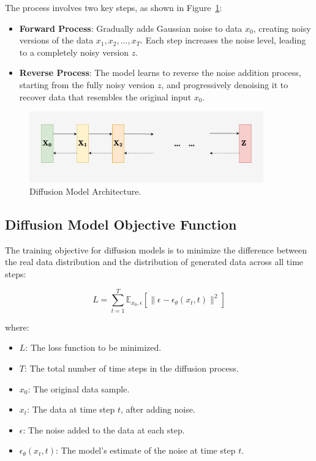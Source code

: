 The process involves two key steps, as shown in Figure~\ref{fig:Diffusion_structure}:
\begin{itemize}
  \item \textbf{Forward Process}: Gradually adds Gaussian noise to data \(x_0\), creating noisy versions of the data \(x_1, x_2, \dots, x_T\). Each step increases the noise level, leading to a completely noisy version \(z\).
  \item \textbf{Reverse Process}: The model learns to reverse the noise addition process, starting from the fully noisy version \(z\), and progressively denoising it to recover data that resembles the original input \(x_0\).
\end{itemize}

\begin{figure}[H]
    \centering
    \includegraphics[width=0.9\textwidth]{./Images/Diffusion_structure.jpg}
    \caption{Diffusion Model Architecture.}
    \label{fig:Diffusion_structure}
\end{figure}

\subsection{Diffusion Model Objective Function}

The training objective for diffusion models is to minimize the difference between the real data distribution and the distribution of generated data across all time steps:

\begin{equation}
L = \sum_{t=1}^{T} \mathbb{E}_{x_0, \epsilon} \left[ \|\epsilon - \epsilon_\theta(x_t, t)\|^2 \right]
\end{equation}

where:
\begin{itemize}
    \item \(L\): The loss function to be minimized.
    \item \(T\): The total number of time steps in the diffusion process.
    \item \(x_0\): The original data sample.
    \item \(x_t\): The data at time step \(t\), after adding noise.
    \item \(\epsilon\): The noise added to the data at each step.
    \item \(\epsilon_\theta(x_t, t)\): The model's estimate of the noise at time step \(t\).
\end{itemize}

